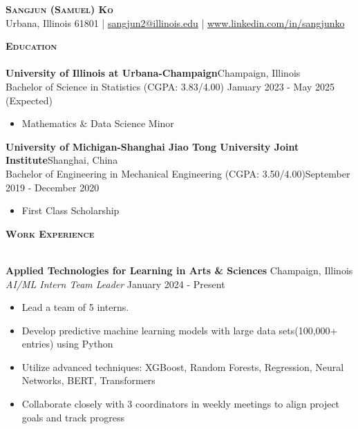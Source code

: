 \documentclass[a4paper]{article}
\newcommand{\lineunder} {
    \vspace*{-8pt} \\
    \hspace*{-18pt} \hrulefill \\
}
\newcommand{\header} [1] {
    {\hspace*{-18pt}\vspace*{6pt} \textsc{#1}}
    \vspace*{-6pt} \lineunder
}
\begin{document}
\vspace*{-40pt}

    

\vspace*{-10pt}
\begin{center}
	{\Huge \scshape \textbf{Sangjun (Samuel) Ko}}\\
    Urbana, Illinois 61801 
    | \href{mailto:sangjun2@illinois.edu}{sangjun2@illinois.edu}
    | \href{https://www.linkedin.com/in/sangjunko}{www.linkedin.com/in/sangjunko}

	  
\end{center}

\header{\textbf{Education}}
\textbf{University of Illinois at Urbana-Champaign}\hfill Champaign, Illinois \\
Bachelor of Science in Statistics (CGPA: 3.83/4.00) \hfill January 2023 - May 2025 (Expected) \\ 
    \begin{itemize}[noitemsep]
        \item Mathematics \& Data Science Minor
    \end{itemize}

\textbf{University of Michigan-Shanghai Jiao Tong University Joint Institute}\hfill Shanghai, China\\
Bachelor of Engineering in Mechanical Engineering (CGPA: 3.50/4.00)\hfill September 2019 - December 2020\\
    \begin{itemize}[noitemsep]
        \item First Class Scholarship
    \end{itemize}

\vspace{2mm}

\header{\textbf{Work Experience}}
\vspace{1mm}


\textbf{Applied Technologies for Learning in Arts \& Sciences}
\hfill Champaign, Illinois\\
\textit{AI/ML Intern Team Leader} \hfill January 2024 - Present\\

    \begin{itemize}[noitemsep]
        \item Lead a team of 5 interns. 
        \item Develop predictive machine learning models with large data sets(100,000+ entries) using Python
        \item Utilize advanced techniques: XGBoost, Random Forests, Regression, Neural Networks, BERT, Transformers
        \item Collaborate closely with 3 coordinators in weekly meetings to align project goals and track progress
    \end{itemize}
\end{document}
